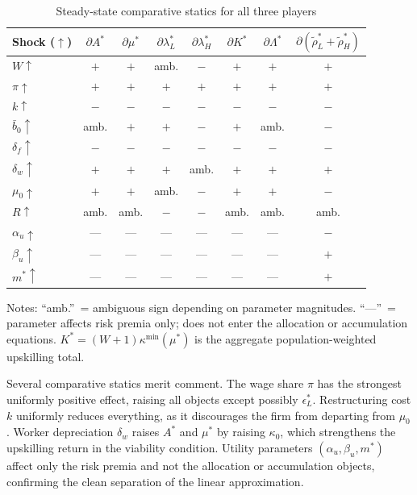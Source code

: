\documentclass[12pt,a4paper]{article}
\begin{document}
\begin{table}[h!]
\centering
\caption{Steady-state comparative statics for all three players}
\label{tab:cs}
\renewcommand{\arraystretch}{1.2}
\begin{tabular}{lccccccc}
\toprule
Shock ($\uparrow$)
  & $\partial A^*$
  & $\partial\mu^*$
  & $\partial\lambda_L^*$
  & $\partial\lambda_H^*$
  & $\partial K^*$
  & $\partial\Lambda^*$
  & $\partial(\tilde\rho_L^*{+}\tilde\rho_H^*)$ \\
\midrule
$W\uparrow$         & $+$   & $+$   & amb.  & $-$   & $+$   & $+$   & $+$   \\
$\pi\uparrow$       & $+$   & $+$   & $+$   & $+$   & $+$   & $+$   & $+$   \\
$k\uparrow$         & $-$   & $-$   & $-$   & $-$   & $-$   & $-$   & $-$   \\
$\bar{b}_0\uparrow$ & amb.  & $+$   & $+$   & $-$   & $+$   & amb.  & $-$   \\
$\delta_f\uparrow$  & $-$   & $-$   & $-$   & $-$   & $-$   & $-$   & $-$   \\
$\delta_w\uparrow$  & $+$   & $+$   & $+$   & amb.  & $+$   & $+$   & $+$   \\
$\mu_0\uparrow$     & $+$   & $+$   & amb.  & $-$   & $+$   & $+$   & $-$   \\
$R\uparrow$         & amb.  & amb.  & $-$   & $-$   & amb.  & amb.  & amb.  \\
$\alpha_u\uparrow$  & ---   & ---   & ---   & ---   & ---   & ---   & $-$   \\
$\beta_u\uparrow$   & ---   & ---   & ---   & ---   & ---   & ---   & $+$   \\
$m^*\uparrow$       & ---   & ---   & ---   & ---   & ---   & ---   & $+$   \\
\bottomrule
\end{tabular}
\medskip

\small Notes: ``amb.''\ = ambiguous sign depending on parameter magnitudes.
``---''\ = parameter affects risk premia only; does not enter the allocation
or accumulation equations. $K^* = (W+1)\kappa^{\min}(\mu^*)$ is the
aggregate population-weighted upskilling total.
\end{table}

Several comparative statics merit comment. The wage share $\pi$ has
the strongest uniformly positive effect, raising all objects except
possibly $\epsilon_L^*$. Restructuring cost $k$ uniformly reduces
everything, as it discourages the firm from departing from $\mu_0$.
Worker depreciation $\delta_w$ raises $A^*$ and $\mu^*$ by raising
$\kappa_0$, which strengthens the upskilling return in the viability
condition. Utility parameters $(\alpha_u,\beta_u,m^*)$ affect only the
risk premia and not the allocation or accumulation objects, confirming
the clean separation of the linear approximation.
\end{document}
